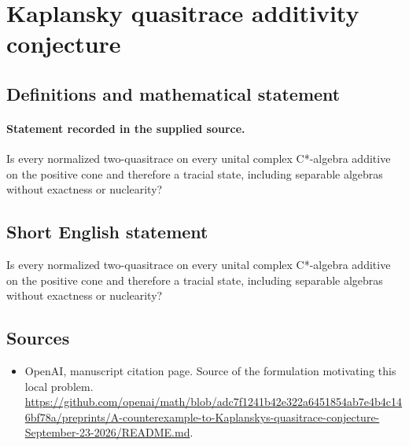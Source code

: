 \documentclass[11pt]{article}
\begin{document}
\section*{Kaplansky quasitrace additivity conjecture}\label{statement}
\subsection{Definitions and mathematical statement}
\paragraph{Statement recorded in the supplied source.}
Is every normalized two-quasitrace on every unital complex C*-algebra additive on the positive cone and therefore a tracial state, including separable algebras without exactness or nuclearity?
\subsection{Short English statement}
Is every normalized two-quasitrace on every unital complex C*-algebra additive on the positive cone and therefore a tracial state, including separable algebras without exactness or nuclearity?
\subsection{Sources}
\begin{itemize}
\item[S1] OpenAI, manuscript citation page. Source of the formulation motivating this local problem.
\url{https://github.com/openai/math/blob/adc7f1241b42e322a6451854ab7e4b4c146bf78a/preprints/A-counterexample-to-Kaplanskys-quasitrace-conjecture-September-23-2026/README.md}.
\end{itemize}
\end{document}
